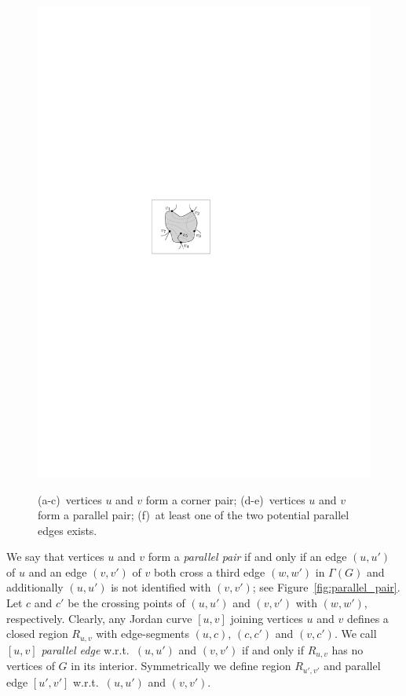 \begin{figure}[tb]
\begin{minipage}[b]{.16\textwidth}
        \includegraphics[width=\textwidth,page=7]{images/preliminaries}
        \subcaption{~}\label{fig:parallel_pair_homotopic}
    \end{minipage}
    \caption{%
    (a-c)~vertices $u$ and $v$ form a corner pair;
    (d-e)~vertices $u$ and $v$ form a parallel pair; 
    (f)~at least one of the two potential parallel edges exists.}
    \label{fig:crossing_confs}
\end{figure} 

We say that vertices $u$ and $v$ form a \emph{parallel pair} if and only if an edge $(u,u')$ of $u$ and an edge $(v,v')$ of $v$ both cross a third edge $(w,w')$ in $\Gamma(G)$ and additionally $(u,u')$ is not identified with $(v,v')$; see Figure~\ref{fig:parallel_pair}. Let $c$ and $c'$ be the crossing points of $(u,u')$ and $(v,v')$ with $(w,w')$, respectively. Clearly, any Jordan curve $[u,v]$ joining vertices $u$ and $v$ defines a closed region $R_{u,v}$ with edge-segments $(u,c)$, $(c,c')$ and $(v,c')$. We call $[u,v]$ \emph{parallel edge} w.r.t.~$(u,u')$ and $(v,v')$ if and only if $R_{u,v}$ has no vertices of $G$ in its interior. Symmetrically we define region $R_{u',v'}$ and parallel edge $[u',v']$ w.r.t.~$(u,u')$ and $(v,v')$.

